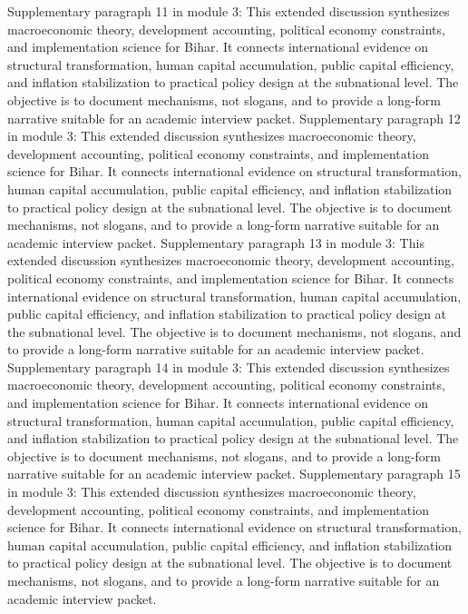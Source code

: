 \documentclass[preprint,12pt]{elsarticle}
\begin{document}
Supplementary paragraph 11 in module 3: This extended discussion synthesizes macroeconomic theory, development accounting, political economy constraints, and implementation science for Bihar. It connects international evidence on structural transformation, human capital accumulation, public capital efficiency, and inflation stabilization to practical policy design at the subnational level. The objective is to document mechanisms, not slogans, and to provide a long-form narrative suitable for an academic interview packet.
Supplementary paragraph 12 in module 3: This extended discussion synthesizes macroeconomic theory, development accounting, political economy constraints, and implementation science for Bihar. It connects international evidence on structural transformation, human capital accumulation, public capital efficiency, and inflation stabilization to practical policy design at the subnational level. The objective is to document mechanisms, not slogans, and to provide a long-form narrative suitable for an academic interview packet.
Supplementary paragraph 13 in module 3: This extended discussion synthesizes macroeconomic theory, development accounting, political economy constraints, and implementation science for Bihar. It connects international evidence on structural transformation, human capital accumulation, public capital efficiency, and inflation stabilization to practical policy design at the subnational level. The objective is to document mechanisms, not slogans, and to provide a long-form narrative suitable for an academic interview packet.
Supplementary paragraph 14 in module 3: This extended discussion synthesizes macroeconomic theory, development accounting, political economy constraints, and implementation science for Bihar. It connects international evidence on structural transformation, human capital accumulation, public capital efficiency, and inflation stabilization to practical policy design at the subnational level. The objective is to document mechanisms, not slogans, and to provide a long-form narrative suitable for an academic interview packet.
Supplementary paragraph 15 in module 3: This extended discussion synthesizes macroeconomic theory, development accounting, political economy constraints, and implementation science for Bihar. It connects international evidence on structural transformation, human capital accumulation, public capital efficiency, and inflation stabilization to practical policy design at the subnational level. The objective is to document mechanisms, not slogans, and to provide a long-form narrative suitable for an academic interview packet.
\end{document}
